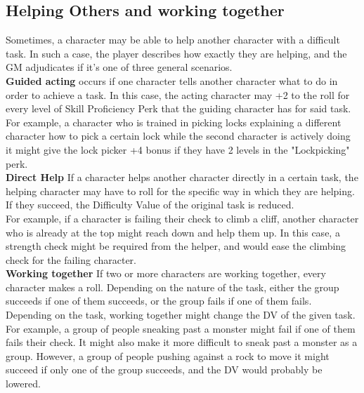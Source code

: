 \subsection{Helping Others and working together}\label{subsec:helping}
Sometimes, a character may be able to help another character with a difficult task.
In such a case, the player describes how exactly they are helping, and the GM adjudicates if it's one of three general scenarios.\\
\textbf{Guided acting} occurs if one character tells another character what to do in order to achieve a task.
In this case, the acting character may +2 to the roll for every level of Skill Proficiency Perk that the guiding character has for said task.\\
For example, a character who is trained in picking locks explaining a different character how to pick a certain lock while the second character is actively doing it might give the lock picker +4 bonus if they have 2 levels in the "Lockpicking" perk.\\
\textbf{Direct Help} If a character helps another character directly in a certain task, the helping character may have to roll for the specific way in which they are helping.
If they succeed, the Difficulty Value of the original task is reduced.\\
For example, if a character is failing their check to climb a cliff, another character who is already at the top might reach down and help them up.
In this case, a strength check might be required from the helper, and would ease the climbing check for the failing character.\\
\textbf{Working together} If two or more characters are working together, every character makes a roll.
Depending on the nature of the task, either the group succeeds if one of them succeeds, or the group fails if one of them fails.\\
Depending on the task, working together might change the DV of the given task.\\
For example, a group of people sneaking past a monster might fail if one of them fails their check.
It might also make it more difficult to sneak past a monster as a group.
However, a group of people pushing against a rock to move it might succeed if only one of the group succeeds, and the DV would probably be lowered.

